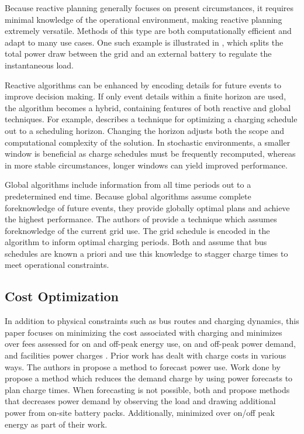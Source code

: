 \par Because reactive planning generally focuses on present circumstances, it requires minimal knowledge of the operational environment, making reactive planning extremely versatile.  Methods of this type are both computationally efficient and adapt to many use cases.  One such example is illustrated in \cite{cheng_smart_2020}, which splits the total power draw between the grid and an external battery to regulate the instantaneous load.
\par Reactive algorithms can be enhanced by encoding details for future events to improve decision making. If only event details within a finite horizon are used, the algorithm becomes a hybrid, containing features of both reactive and global techniques. For example, \cite{bagherinezhad_spatio-temporal_2020} describes a technique for optimizing a charging schedule out to a scheduling horizon. Changing the horizon adjusts both the scope and computational complexity of the solution. In stochastic environments, a smaller window is beneficial as charge schedules must be frequently recomputed, whereas in more stable circumstances, longer windows can yield improved performance. 
\par Global algorithms include information from all time periods out to a predetermined end time. Because global algorithms assume complete foreknowledge of future events, they provide globally optimal plans and achieve the highest performance. The authors of \cite{jahic_preemptive_2019} provide a technique which assumes foreknowledge of the current grid use. The grid schedule is encoded in the algorithm to inform optimal charging periods. Both \cite{whitaker_network_2021} and \cite{el-taweel_incorporation_2019} assume that bus schedules are known a priori and use this knowledge to stagger charge times to meet operational constraints.
\subsection{Cost Optimization}
In addition to physical constraints such as bus routes and charging dynamics, this paper focuses on minimizing the cost associated with charging and minimizes over fees assessed for on and off-peak energy use, on and off-peak power demand, and facilities power charges \cite{noauthor_rocky_nodate}. Prior work has dealt with charge costs in various ways.  
The authors in \cite{gao_charging_2019} propose a method to forecast power use. Work done by \cite{qin_numerical_2016} propose a method which reduces the demand charge by using power forecasts to plan charge times\cite{gao_charging_2019}.  When forecasting is not possible, both \cite{ojer_development_2020} and \cite{cheng_smart_2020} propose methods that decreases power demand by observing the load and drawing additional power from on-site battery packs. Additionally, \cite{el-taweel_incorporation_2019} minimized over on/off peak energy as part of their work.
